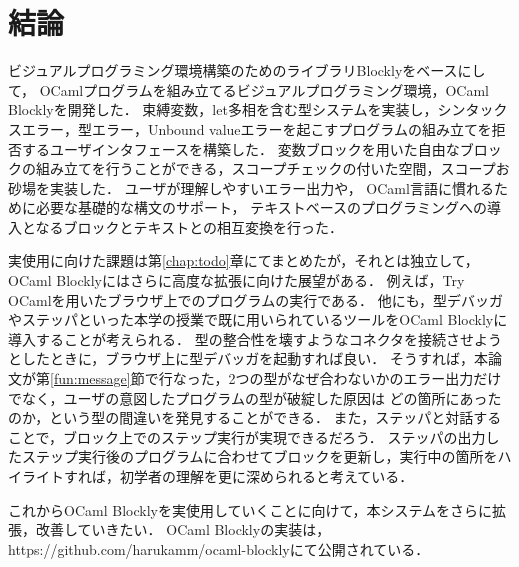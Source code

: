 \chapter {結論}\label{chap:conclusion}

ビジュアルプログラミング環境構築のためのライブラリBlocklyをベースにして，
OCamlプログラムを組み立てるビジュアルプログラミング環境，OCaml Blocklyを開発した．
束縛変数，let多相を含む型システムを実装し，シンタックスエラー，型エラー，Unbound valueエラーを起こすプログラムの組み立てを拒否するユーザインタフェースを構築した．
変数ブロックを用いた自由なブロックの組み立てを行うことができる，スコープチェックの付いた空間，スコープお砂場を実装した．
ユーザが理解しやすいエラー出力や，
OCaml言語に慣れるために必要な基礎的な構文のサポート，
テキストベースのプログラミングへの導入となるブロックとテキストとの相互変換を行った．

実使用に向けた課題は第\ref{chap:todo}章にてまとめたが，それとは独立して，OCaml Blocklyにはさらに高度な拡張に向けた展望がある．
例えば，Try OCamlを用いたブラウザ上でのプログラムの実行である．
他にも，型デバッガ\cite{10.1007/978-3-642-41582-1_12}やステッパ\cite{Stepper}といった本学の授業で既に用いられているツールをOCaml Blocklyに導入することが考えられる．
型の整合性を壊すようなコネクタを接続させようとしたときに，ブラウザ上に型デバッガを起動すれば良い．
そうすれば，本論文が第\ref{fun:message}節で行なった，2つの型がなぜ合わないかのエラー出力だけでなく，ユーザの意図したプログラムの型が破綻した原因は
どの箇所にあったのか，という型の間違いを発見することができる．
また，ステッパと対話することで，ブロック上でのステップ実行が実現できるだろう．
ステッパの出力したステップ実行後のプログラムに合わせてブロックを更新し，実行中の箇所をハイライトすれば，初学者の理解を更に深められると考えている．
 

これからOCaml Blocklyを実使用していくことに向けて，本システムをさらに拡張，改善していきたい．
OCaml Blocklyの実装は，https://github.com/harukamm/ocaml-blocklyにて公開されている．

